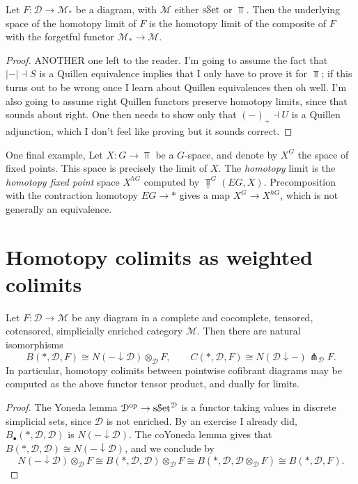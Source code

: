 \begin{lemma}\label{lma:6.3}
	Let $F : \mathcal{D}  \to \mathcal{M} _*$ be a diagram, with $\mathcal{M} $ either $\mathrm{s}\mathcal{S}\mathrm{et}$ or $\Top $. Then the underlying space of the homotopy limit of $F$ is the homotopy limit of the composite of $F$ with the forgetful functor $\mathcal{M} _*\to \mathcal{M} $.
\end{lemma}
\begin{proof}
	ANOTHER one left to the reader. I'm going to assume the fact that $\left| - \right| \dashv S$ is a Quillen equivalence implies that I only have to prove it for $\Top $; if this turns out to be wrong once I learn about Quillen equivalences then oh well. I'm also going to assume right Quillen functors preserve homotopy limits, since that sounds about right. One then needs to show only that $(-)_+\dashv U$ is a Quillen adjunction, which I don't feel like proving but it sounds correct.
\end{proof}

One final example, Let $X : G \to \Top $ be a $G$-space, and denote by $X^G$ the space of fixed points. This space is precisely the limit of $X$. The \emph{homotopy} limit is the \emph{homotopy fixed point} space $X^{hG} $ computed by $\underline{\Top }  ^G(EG,X)$. Precomposition with the contraction homotopy $EG\to *$ gives a map $X^G\to X^{hG} $, which is not generally an equivalence.

\section{Homotopy colimits as weighted colimits}

\begin{theorem}\label{thm:6.4}
	Let $F : \mathcal{D}  \to \mathcal{M} $ be any diagram in a complete and cocomplete, tensored, cotensored, simplicially enriched category $\mathcal{M} $. Then there are natural isomorphisms
	\[
		B(*,\mathcal{D} ,F)\cong N(-\downarrow \mathcal{D} )\otimes _\mathcal{D} F,\qquad C(*,\mathcal{D} ,F)\cong N(\mathcal{D} \downarrow -)\pitchfork_\mathcal{D} F
	.\]
	In particular, homotopy colimits between pointwise cofibrant diagrams may be computed as the above functor tensor product, and dually for limits.
\end{theorem}
\begin{proof}
	The Yoneda lemma $\mathcal{D} ^{\mathrm{op}} \to \mathrm{s}\mathcal{S}\mathrm{et}^{\mathcal{D} } $ is a functor taking values in discrete simplicial sets, since $\mathcal{D} $ is not enriched. By an exercise I already did, $B_{\bullet} (*,\mathcal{D} ,\mathcal{D} )$ is $N(-\downarrow \mathcal{D} )$. The coYoneda lemma gives that  $B(*,\mathcal{D} ,\mathcal{D} )\cong N(-\downarrow \mathcal{D} )$, and we conclude by
	\[
		N(-\downarrow \mathcal{D} )\otimes_\mathcal{D} F\cong B(*,\mathcal{D} ,\mathcal{D} )\otimes _\mathcal{D} F\cong B(*,\mathcal{D} ,\mathcal{D} \otimes _\mathcal{D} F)\cong B(*,\mathcal{D} ,F)
	.\]
\end{proof}

